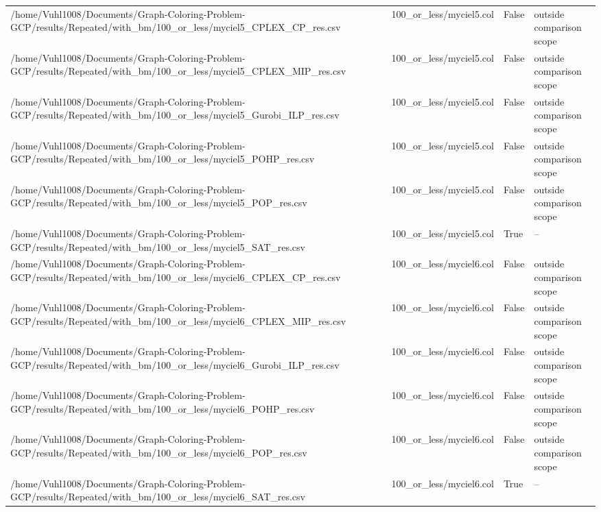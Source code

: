 \begin{table}[htbp]
\begin{tabular}{llll}
/home/Vuhl1008/Documents/Graph-Coloring-Problem-GCP/results/Repeated/with\_bm/100\_or\_less/myciel5\_CPLEX\_CP\_res.csv & 100\_or\_less/myciel5.col & False & outside comparison scope \\
/home/Vuhl1008/Documents/Graph-Coloring-Problem-GCP/results/Repeated/with\_bm/100\_or\_less/myciel5\_CPLEX\_MIP\_res.csv & 100\_or\_less/myciel5.col & False & outside comparison scope \\
/home/Vuhl1008/Documents/Graph-Coloring-Problem-GCP/results/Repeated/with\_bm/100\_or\_less/myciel5\_Gurobi\_ILP\_res.csv & 100\_or\_less/myciel5.col & False & outside comparison scope \\
/home/Vuhl1008/Documents/Graph-Coloring-Problem-GCP/results/Repeated/with\_bm/100\_or\_less/myciel5\_POHP\_res.csv & 100\_or\_less/myciel5.col & False & outside comparison scope \\
/home/Vuhl1008/Documents/Graph-Coloring-Problem-GCP/results/Repeated/with\_bm/100\_or\_less/myciel5\_POP\_res.csv & 100\_or\_less/myciel5.col & False & outside comparison scope \\
/home/Vuhl1008/Documents/Graph-Coloring-Problem-GCP/results/Repeated/with\_bm/100\_or\_less/myciel5\_SAT\_res.csv & 100\_or\_less/myciel5.col & True & -- \\
/home/Vuhl1008/Documents/Graph-Coloring-Problem-GCP/results/Repeated/with\_bm/100\_or\_less/myciel6\_CPLEX\_CP\_res.csv & 100\_or\_less/myciel6.col & False & outside comparison scope \\
/home/Vuhl1008/Documents/Graph-Coloring-Problem-GCP/results/Repeated/with\_bm/100\_or\_less/myciel6\_CPLEX\_MIP\_res.csv & 100\_or\_less/myciel6.col & False & outside comparison scope \\
/home/Vuhl1008/Documents/Graph-Coloring-Problem-GCP/results/Repeated/with\_bm/100\_or\_less/myciel6\_Gurobi\_ILP\_res.csv & 100\_or\_less/myciel6.col & False & outside comparison scope \\
/home/Vuhl1008/Documents/Graph-Coloring-Problem-GCP/results/Repeated/with\_bm/100\_or\_less/myciel6\_POHP\_res.csv & 100\_or\_less/myciel6.col & False & outside comparison scope \\
/home/Vuhl1008/Documents/Graph-Coloring-Problem-GCP/results/Repeated/with\_bm/100\_or\_less/myciel6\_POP\_res.csv & 100\_or\_less/myciel6.col & False & outside comparison scope \\
/home/Vuhl1008/Documents/Graph-Coloring-Problem-GCP/results/Repeated/with\_bm/100\_or\_less/myciel6\_SAT\_res.csv & 100\_or\_less/myciel6.col & True & -- \\

\end{tabular}
\end{table}
